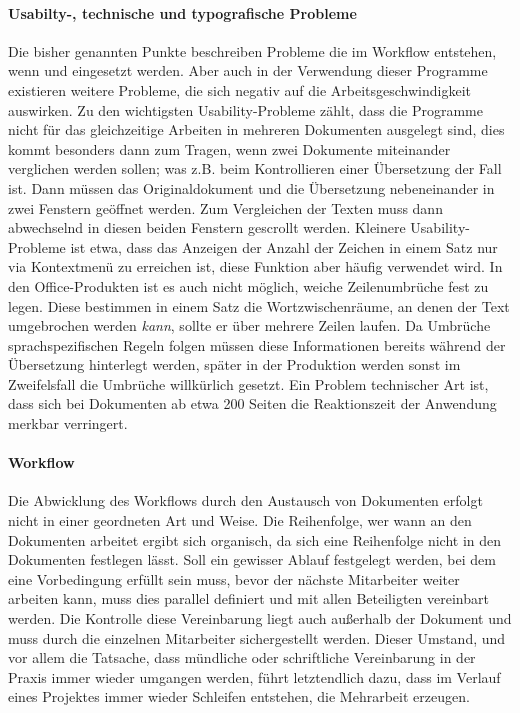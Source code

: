 \paragraph{Usabilty-, technische und typografische Probleme} Die bisher genannten Punkte beschreiben Probleme die im Workflow entstehen, wenn  und  eingesetzt werden. Aber auch in der Verwendung dieser Programme existieren weitere Probleme, die sich negativ auf die Arbeitsgeschwindigkeit auswirken. Zu den wichtigsten Usability-Probleme zählt, dass die Programme nicht für das gleichzeitige Arbeiten in mehreren Dokumenten ausgelegt sind, dies kommt besonders dann zum Tragen, wenn zwei Dokumente miteinander verglichen werden sollen; was z.B. beim Kontrollieren einer Übersetzung der Fall ist. Dann müssen das Originaldokument und die Übersetzung nebeneinander in zwei Fenstern geöffnet werden. Zum Vergleichen der Texten muss dann abwechselnd in diesen beiden Fenstern gescrollt werden. Kleinere Usability-Probleme ist etwa, dass das Anzeigen der Anzahl der Zeichen in einem Satz nur via Kontextmenü zu erreichen ist, diese Funktion aber häufig verwendet wird. In den Office-Produkten ist es auch nicht möglich, weiche Zeilenumbrüche fest zu legen. Diese bestimmen in einem Satz die Wortzwischenräume, an denen der Text umgebrochen werden \emph{kann}, sollte er über mehrere Zeilen laufen. Da Umbrüche sprachspezifischen Regeln folgen müssen diese Informationen bereits während der Übersetzung hinterlegt werden, später in der Produktion werden sonst im Zweifelsfall die Umbrüche willkürlich gesetzt. Ein Problem technischer Art ist, dass sich bei Dokumenten ab etwa 200 Seiten die Reaktionszeit der Anwendung merkbar verringert.

\paragraph{Workflow} Die Abwicklung des Workflows durch den Austausch von Dokumenten erfolgt nicht in einer geordneten Art und Weise. Die Reihenfolge, wer wann an den Dokumenten arbeitet ergibt sich organisch, da sich eine Reihenfolge nicht in den Dokumenten festlegen lässt. Soll ein gewisser Ablauf festgelegt werden, bei dem eine Vorbedingung erfüllt sein muss, bevor der nächste Mitarbeiter weiter arbeiten kann, muss dies parallel definiert und mit allen Beteiligten vereinbart werden. Die Kontrolle diese Vereinbarung liegt auch außerhalb der Dokument und muss durch die einzelnen Mitarbeiter sichergestellt werden. Dieser Umstand, und vor allem die Tatsache, dass mündliche oder schriftliche Vereinbarung in der Praxis immer wieder umgangen werden, führt letztendlich dazu, dass im Verlauf eines Projektes immer wieder Schleifen entstehen, die Mehrarbeit erzeugen.

